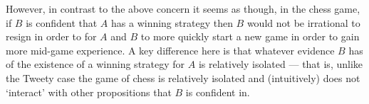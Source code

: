 \documentclass[10pt]{article}
\begin{document}
However, in contrast to the above concern it seems as though, in the chess game, if \(B\) is confident that \(A\) has a winning strategy then \(B\) would not be irrational to resign in order to for \(A\) and \(B\) to more quickly start a new game in order to gain more mid-game experience.
A key difference here is that whatever evidence \(B\) has of the existence of a winning strategy for \(A\) is relatively isolated --- that is, unlike the Tweety case the game of chess is relatively isolated and (intuitively) does not `interact' with other propositions that \(B\) is confident in.





\newpage
\end{document}
